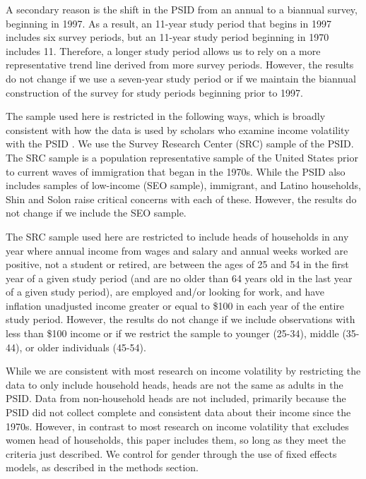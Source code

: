 \documentclass[12pt]{article}
\begin{document}
A secondary reason is the shift in the PSID from an annual to a biannual survey, beginning in 1997. As a result, an 11-year study period that begins in 1997 includes six survey periods, but an 11-year study period beginning in 1970 includes 11. Therefore, a longer study period allows us to rely on a more representative trend line derived from more survey periods. However, the results do not change if we use a seven-year study period or if we maintain the biannual construction of the survey for study periods beginning prior to 1997.

The sample used here is restricted in the following ways, which is broadly consistent with how the data is used by scholars who examine income volatility with the PSID \citep{shin_solon_2011,dynan_etal_2012,moffitt_gottschalk_2012}. We use the Survey Research Center (SRC) sample of the PSID. The SRC sample is a population representative sample of the United States prior to current waves of immigration that began in the 1970s.  While the PSID also includes samples of low-income (SEO sample), immigrant, and Latino households, Shin and Solon \citeyearpar{shin_solon_2011} raise critical concerns with each of these. However, the results do not change if we include the SEO sample.

The SRC sample used here are restricted to include heads of households in any year where annual income from wages and salary and annual weeks worked are positive, not a student or retired, are between the ages of 25 and 54 in the first year of a given study period (and are no older than 64 years old in the last year of a given study period), are employed and/or looking for work, and have inflation unadjusted income greater or equal to \$100 in each year of the entire study period. However, the results do not change if we include observations with less than \$100 income or if we restrict the sample to younger (25-34), middle (35-44), or older individuals (45-54).

While we are consistent with most research on income volatility by restricting the data to only include household heads, heads are not the same as adults in the PSID. Data from non-household heads are not included, primarily because the PSID did not collect complete and consistent data about their income since the 1970s. However, in contrast to most research on income volatility that excludes women head of households, this paper includes them, so long as they meet the criteria just described. We control for gender through the use of fixed effects models, as described in the methods section.
\end{document}

